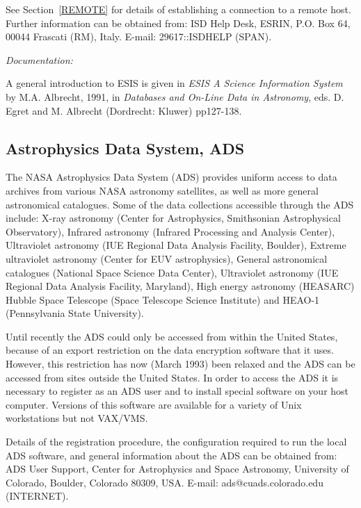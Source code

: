 See Section~\ref{REMOTE} for details of establishing a connection to
a remote host. Further information can be obtained from: ISD Help Desk,
ESRIN, P.O. Box 64, 00044 Frascati (RM), Italy. E-mail: 29617::ISDHELP
(SPAN).

{\it Documentation:}

A general introduction to ESIS is given in {\it ESIS A Science 
Information System} by M.A. Albrecht, 1991, in {\it Databases and 
On-Line Data in Astronomy}, eds. D. Egret and M. Albrecht (Dordrecht: 
Kluwer) pp127-138.

\subsection{Astrophysics Data System, ADS
}

The NASA Astrophysics Data System (ADS) provides uniform access to data
archives from various NASA astronomy satellites, as well as more general
astronomical catalogues. Some of the data collections accessible through 
the ADS include: X-ray astronomy (Center for Astrophysics, Smithsonian 
Astrophysical Observatory), Infrared astronomy (Infrared Processing and
Analysis Center), Ultraviolet astronomy (IUE Regional Data Analysis 
Facility, Boulder), Extreme ultraviolet astronomy (Center for EUV 
astrophysics), General astronomical catalogues (National Space Science
Data Center), Ultraviolet astronomy (IUE Regional Data Analysis 
Facility, Maryland), High energy astronomy (HEASARC) Hubble Space
Telescope (Space Telescope Science Institute) and HEAO-1 (Pennsylvania
State University).

Until recently the ADS could only be accessed from within the United 
States, because of an export restriction on the data encryption software
that it uses. However, this restriction has now (March 1993) been 
relaxed and the ADS can be accessed from sites outside the United 
States. In order to access the ADS it is necessary to register as an ADS
user and to install special software on your host computer. Versions of 
this software are available for a variety of Unix workstations but not 
VAX/VMS.

Details of the registration procedure, the configuration required to
run the local ADS software, and general information about the ADS can be
obtained from: ADS User Support, Center for Astrophysics and Space 
Astronomy, University of Colorado, Boulder, Colorado 80309, USA. E-mail:
ads@cuads.colorado.edu (INTERNET).

